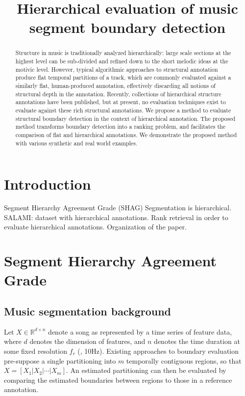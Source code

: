 \documentclass{article}
\title{Hierarchical evaluation of music segment boundary detection}
\begin{document}
%
\maketitle
%
\begin{abstract}
Structure in music is traditionally analyzed hierarchically: large scale sections at the highest level can be sub-divided and refined down to the short melodic ideas at the motivic level. 
However, typical algorithmic approaches to structural annotation produce flat temporal partitions of a track, which are commonly evaluated against a similarly flat, human-produced
annotation, effectively discarding all notions of structural depth in the annotation.
Recently, collections of hierarchical structure annotations have been published, but at present, no evaluation techniques exist to evaluate against these rich structural annotations.
We propose a method to evaluate structural boundary detection in the context of hierarchical annotation.
The proposed method transforms boundary detection into a ranking problem, and facilitates the comparison of flat and hierarchical annotations.
We demonstrate the proposed method with various synthetic and real world examples. 
\end{abstract}
%
\section{Introduction}\label{sec:introduction}

  Segment Hierarchy Agreement Grade (SHAG)
Segmentation is hierarchical.
SALAMI: dataset with hierarchical annotations.
Rank retrieval in order to evaluate hierarchical annotations.
Organization of the paper.

\section{Segment Hierarchy Agreement Grade}\label{sec:eval_desc}

\subsection{Music segmentation background}

Let $X \in \mathbb{R}^{d\times n}$ denote a song as represented by a time series of 
feature data, where $d$ denotes the dimension of features, and $n$ denotes the
time duration at some fixed resolution $f_r$ (\eg, 10Hz).
Existing approaches to boundary evaluation pre-suppose a single partitioning into $m$
temporally contiguous regions, so that $X=[X_1|X_2|\cdots|X_m]$.  An estimated
partitioning can then be evaluated by comparing the estimated boundaries between
regions to those in a reference annotation.
\end{document}
